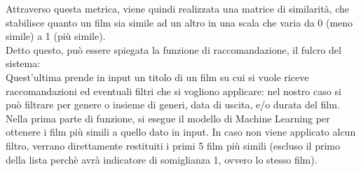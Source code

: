 \documentclass{report}
\begin{document}
        Attraverso questa metrica, viene quindi realizzata una matrice di similarità, che stabilisce quanto un film sia simile ad un altro in una scala che varia da 0 (meno simile) a 1 (più simile). \\
        Detto questo, può essere spiegata la funzione di raccomandazione, il fulcro del sistema: \\
        Quest'ultima prende in input un titolo di un film su cui si vuole riceve raccomandazioni ed eventuali filtri che si vogliono applicare: nel nostro caso si può filtrare per genere o insieme di generi, data di uscita, e/o durata del film.
        Nella prima parte di funzione, si esegue il modello di Machine Learning per ottenere i film più simili a quello dato in input. In caso non viene applicato alcun filtro, verrano direttamente restituiti i primi 5 film più simili (escluso il primo della lista perchè avrà indicatore di somiglianza 1, ovvero lo stesso film).      
        
\end{document}

